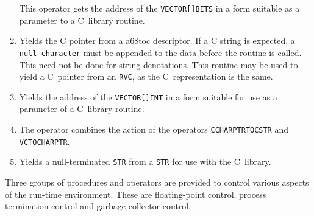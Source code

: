 \begin{enumerate}
This operator gets the address of the \verb|VECTOR[]BITS| in a form
suitable as a parameter to a C~library routine.
\item {}\newline
Yields the C pointer from a a68toc descriptor. If a C string is
expected, a \verb|null character| must be appended to the data before
the routine is called. This need not be done for string denotations.
This routine may be used to yield a C~pointer from an \verb|RVC|, as
the C~representation is the same.
\item {}\newline
Yields the address of the \verb|VECTOR[]INT| in a form suitable for
use as a parameter of a C~library routine.
\item {}\newline
The operator combines the action of the operators
\texttt{CCHAR\-PTR\-TO\-CSTR} and \verb|VCTOCHARPTR|.
\item {}\newline
Yields a null-terminated \verb|STR| from a \verb|STR| for use with the
C~library.
\end{enumerate}

Three groups of procedures and operators are provided to control
various aspects of the run-time environment. These are floating-point
control, process termination control and garbage-collector control.

